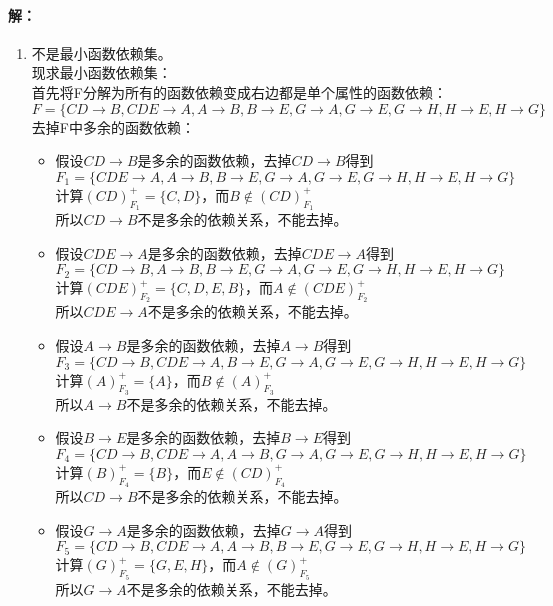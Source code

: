 \paragraph{解：}
\begin{enumerate}
	\item 
	不是最小函数依赖集。\\
	现求最小函数依赖集：\\
	首先将F分解为所有的函数依赖变成右边都是单个属性的函数依赖：$
	F=\{CD \to B, CDE \to A, A \to B, B \to E, G \to A, G \to E, G \to H, H \to E, H \to G\}$\\
	去掉F中多余的函数依赖：
	\begin{itemize}
		\item 
		假设$CD \to B$是多余的函数依赖，去掉$CD \to B$得到$F_{1}=\{CDE \to A, A \to B, B \to E, G \to A, G \to E, G \to H, H \to E, H \to G\}$\\
		计算$(CD)^{+}_{F_{1}}=\{C, D\}$，而$B \notin (CD)^{+}_{F_{1}}$ \\
		所以$CD \to B$不是多余的依赖关系，不能去掉。
		
		\item 
		假设$CDE \to A$是多余的函数依赖，去掉$CDE \to A$得到$F_{2}=\{CD \to B, A \to B, B \to E, G \to A, G \to E, G \to H, H \to E, H \to G\}$\\
		计算$(CDE)^{+}_{F_{2}}=\{C, D, E, B\}$，而$A \notin (CDE)^{+}_{F_{2}}$ \\
		所以$CDE \to A$不是多余的依赖关系，不能去掉。
		
		\item 
		假设$A \to B$是多余的函数依赖，去掉$A \to B$得到$F_{3}=\{CD \to B, CDE \to A, B \to E, G \to A, G \to E, G \to H, H \to E, H \to G\}$\\
		计算$(A)^{+}_{F_{3}}=\{A\}$，而$B \notin (A)^{+}_{F_{3}}$ \\
		所以$A \to B$不是多余的依赖关系，不能去掉。
		
		\item 
		假设$B \to E$是多余的函数依赖，去掉$B \to E$得到$F_{4}=\{CD \to B, CDE \to A, A \to B, G \to A, G \to E, G \to H, H \to E, H \to G\}$\\
		计算$(B)^{+}_{F_{4}}=\{B\}$，而$E \notin (CD)^{+}_{F_{4}}$ \\
		所以$CD \to B$不是多余的依赖关系，不能去掉。
		
		\item 
		假设$G \to A$是多余的函数依赖，去掉$G \to A$得到$F_{5}=\{CD \to B, CDE \to A, A \to B, B \to E, G \to E, G \to H, H \to E, H \to G\}$\\
		计算$(G)^{+}_{F_{5}}=\{G, E, H\}$，而$A \notin (G)^{+}_{F_{5}}$ \\
		所以$G \to A$不是多余的依赖关系，不能去掉。
		

\end{itemize}
\end{enumerate}
